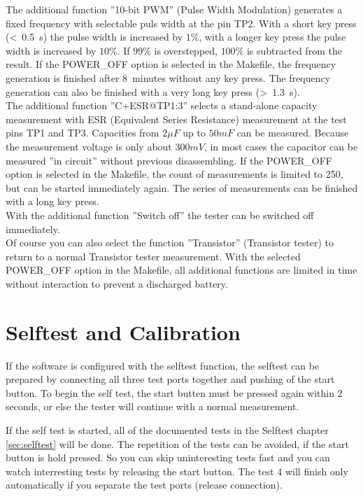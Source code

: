 The additional function ''10-bit PWM'' (Pulse Width Modulation) generates a fixed frequency with selectable
puls width at the pin TP2.
With a short key press (\textless~0.5~s) the pulse width is increased by \(1 \%\), with a longer key press the pulse width
is increased by \(10 \%\).
If \(99 \%\) is overstepped, \(100 \%\) is subtracted from the result.
If the POWER\_OFF option is selected in the Makefile, the frequency generation is finished after 8~minutes without any key press.
The frequency generation can also be finished with a very long key press (\textgreater~1.3~s).\\

The additional function ''C+ESR@TP1:3'' selects a stand-alone capacity measurement with 
ESR (Equivalent Series Resistance) measurement at the test pins TP1 and TP3. 
Capacities from \(2 \mu F\) up to \(50 mF\) can be measured. 
Because the measurement voltage is only about \(300 mV\), in most cases the capacitor can be
measured ''in circuit'' without previous disassembling.
If the POWER\_OFF option is selected in the Makefile, the count of measurements is limited
to 250, but can be started immediately again.
The series of measurements can be finished with a long key press.\\

With the additional function ''Switch off'' the tester can be switched off immediately.\\

Of course you can also select the function ''Transistor'' (Transistor tester) to return to a normal Transistor tester measurement. 
With the selected POWER\_OFF option in the Makefile, all additional functions are limited in time without interaction to prevent a discharged battery.


\section{Selftest and Calibration}

If the software is configured with the selftest function, the selftest can be prepared by connecting all three
test ports together and pushing of the start button.
To begin the self test, the start butten must be pressed again within 2 seconds, or else the tester will continue
with a normal measurement.

If the self test is started, all of the documented tests in the Selftest chapter \ref{sec:selftest} will be done.
The repetition of the tests can be avoided, if the start button is hold pressed.
So you can skip uninteresting tests fast and you can watch interresting tests by releasing the start button.
The test 4 will finish only automatically if you separate the test ports (release connection).


